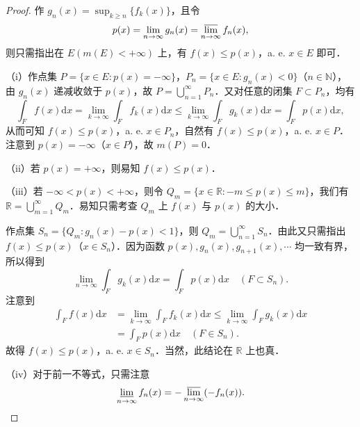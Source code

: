 \documentclass[../../main.tex]{subfiles}%
\begin{document}
\begin{proof}
作 \( g_n(x) = \sup_{k \geqslant n} \{ f_k(x) \} \)，且令
\[
p(x) = \lim_{n \to \infty} g_n(x) = \varlimsup_{n \to \infty} f_n(x),
\]
则只需指出在 \( E(m(E) < +\infty) \) 上，有 \( f(x) \leqslant p(x) \)，a. e. \( x \in E \) 即可．

（i）作点集 \( P = \{ x \in E : p(x) = -\infty \} \)，\( P_n = \{ x \in E : g_n(x) < 0 \} \)（\( n \in \mathbb{N} \)），由 \( g_n(x) \) 递减收敛于 \( p(x) \)，故 \( P = \bigcup_{n=1}^{\infty} P_n \)．又对任意的闭集 \( F \subset P_n \)，均有
\[
\int_F f(x) \mathrm{d}x = \lim_{k \to \infty} \int_F f_k(x) \mathrm{d}x \leqslant \lim_{k \to \infty} \int_F g_k(x) \mathrm{d}x = \int_F p(x) \mathrm{d}x,
\]
从而可知 \( f(x) \leqslant p(x) \)，a. e. \( x \in P_n \)，自然有 \( f(x) \leqslant p(x) \)，a. e. \( x \in P \)．注意到 \( p(x) = -\infty \)（\( x \in P \)），故 \( m(P) = 0 \)．

（ii）若 \( p(x) = +\infty \)，则易知 \( f(x) \leqslant p(x) \)．

（iii）若 \( -\infty < p(x) < +\infty \)，则令 \( Q_m = \{ x \in \mathbb{R} : -m \leqslant p(x) \leqslant m \} \)，我们有 \( \mathbb{R} = \bigcup_{m=1}^{\infty} Q_m \)．易知只需考查 \( Q_m \) 上 \( f(x) \) 与 \( p(x) \) 的大小．

作点集 \( S_n = \{ Q_m : g_n(x) - p(x) < 1 \} \)，则 \( Q_m = \bigcup_{n=1}^{\infty} S_n \)．由此又只需指出 \( f(x) \leqslant p(x) \)（\( x \in S_n \)）．因为函数 \( p(x), g_n(x), g_{n+1}(x), \cdots \) 均一致有界，所以得到
\[
\lim_{n \to \infty} \int_F g_k(x) \mathrm{d}x = \int_F p(x) \mathrm{d}x \quad (F \subset S_n).
\]
注意到
\begin{align*}
\int_F f(x) \mathrm{d}x &= \lim_{k \to \infty} \int_F f_k(x) \mathrm{d}x \leqslant \lim_{k \to \infty} \int_F g_k(x) \mathrm{d}x \\
&= \int_F p(x) \mathrm{d}x \quad (F \in S_n).
\end{align*}
故得 \( f(x) \leqslant p(x) \)，a. e. \( x \in S_n \)．当然，此结论在 \( \mathbb{R} \) 上也真．

（iv）对于前一不等式，只需注意
\[
\varliminf_{n \to \infty} f_n(x) = -\varlimsup_{n \to \infty} (-f_n(x)).
\]
\end{proof}
\end{document}
